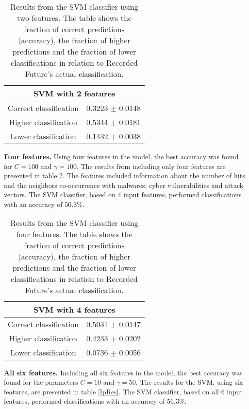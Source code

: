 \begin{table}[h!]
    \centering
    \caption{Results from the SVM classifier using two features. The table shows the fraction of correct predictions (accuracy), the fraction of higher predictions and the fraction of lower classifications in relation to Recorded Future's actual classification.}
    \begin{tabular}{|c|c|}
    \hline
        \multicolumn{2}{|c|}{SVM with 2 features}\\ \hline
        Correct classification  & 0.3223 $\pm$ 0.0148 \\
        Higher classification   & 0.5344 $\pm$ 0.0181 \\
        Lower classification    & 0.1432 $\pm$ 0.0038 \\ \hline
    \end{tabular}
    \label{IpRes2Feat}
\end{table}


\textbf{Four features.} Using four features in the model, the best accuracy was found for $C=100$ and $\gamma=100$. The results from including only four features are presented in table \ref{IpRes4Feat}. The features included information about the number of hits and the neighbors co-occurrence with malwares, cyber vulnerabilities and attack vectors.  The SVM classifier, based on 4 input features, performed classifications with an accuracy of 50.3\%.

\begin{table}[h!]
    \centering
    \caption{Results from the SVM classifier using four features. The table shows the fraction of correct predictions (accuracy), the fraction of higher predictions and the fraction of lower classifications in relation to Recorded Future's actual classification.}
    \begin{tabular}{|c|c|}
    \hline
        \multicolumn{2}{|c|}{SVM with 4 features}\\ \hline
        Correct classification  & 0.5031 $\pm$ 0.0147 \\
        Higher classification   & 0.4233 $\pm$ 0.0202 \\
        Lower classification    & 0.0736 $\pm$ 0.0056 \\ \hline
    \end{tabular}
    \label{IpRes4Feat}
\end{table}


\textbf{All six features.} Including all six features in the model, the best accuracy was found for the parameters $C=10$ and $\gamma=50$. The results for the SVM, using six features, are presented in table \ref{IpRes}. The SVM classifier, based on all 6 input features, performed classifications with an accuracy of 56.3\%.

